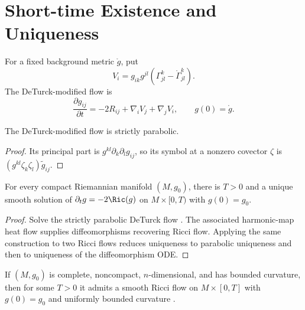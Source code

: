 \section{Short-time Existence and Uniqueness}

For a fixed background metric $\mathring g$, put
\[
V_i=g_{ik}g^{jl}(\Gamma^k_{jl}-\mathring\Gamma^k_{jl}).
\]
The DeTurck-modified flow \cite{De} is
\[
\frac{\partial g_{ij}}{\partial t}=-2R_{ij}+\nabla_iV_j+\nabla_jV_i,
\qquad g(0)=\mathring g.
\]

\begin{lemma}
  \label{lem:cz-strict-parabolicity-of-the-deturck-modified-flow}
The DeTurck-modified flow is strictly parabolic.
\end{lemma}
\begin{proof}
\sketch Its principal part is $g^{kl}\partial_k\partial_lg_{ij}$,
so its symbol at a nonzero covector $\zeta$ is
$(g^{kl}\zeta_k\zeta_l)\widetilde g_{ij}$.
\end{proof}

\begin{theorem}
  \label{thm:cz-short-time-existence-and-uniqueness-on-compact-manifolds}
For every compact Riemannian manifold $(M,g_0)$, there is $T>0$ and
a unique smooth solution of $\partial_tg=-2\Ric(g)$ on
$M\times[0,T)$ with $g(0)=g_0$.
\end{theorem}
\begin{proof}
\sketch Solve the strictly parabolic DeTurck flow \cite{Ha82, De}.  The associated
harmonic-map heat flow supplies diffeomorphisms recovering Ricci flow.
Applying the same construction to two Ricci flows reduces uniqueness to
parabolic uniqueness and then to uniqueness of the diffeomorphism ODE.
\end{proof}

\begin{theorem}
  \label{thm:cz-short-time-existence-on-complete-noncompact-manifolds}
If $(M,g_0)$ is complete, noncompact, $n$-dimensional, and has bounded
curvature, then for some $T>0$ it admits a smooth Ricci flow on
$M\times[0,T]$ with $g(0)=g_0$ and uniformly bounded curvature
\cite{Sh89}.
\end{theorem}

